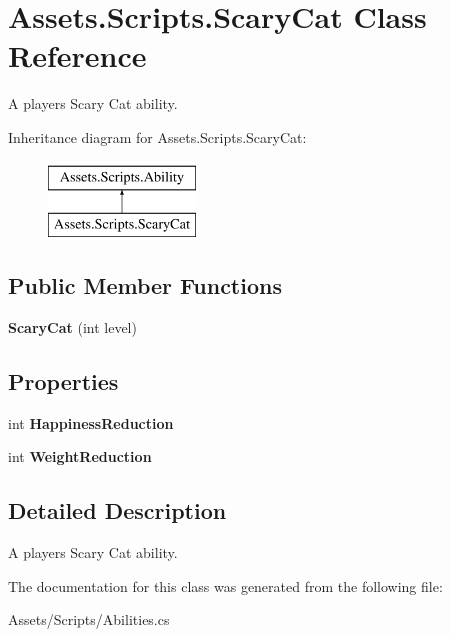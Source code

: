 \hypertarget{class_assets_1_1_scripts_1_1_scary_cat}{}\section{Assets.\+Scripts.\+Scary\+Cat Class Reference}
\label{class_assets_1_1_scripts_1_1_scary_cat}


A player\textquotesingle{}s Scary Cat ability.  


Inheritance diagram for Assets.\+Scripts.\+Scary\+Cat\+:\begin{figure}[H]
\begin{center}
\leavevmode
\includegraphics[height=2.000000cm]{class_assets_1_1_scripts_1_1_scary_cat}
\end{center}
\end{figure}
\subsection*{Public Member Functions}
\begin{DoxyCompactItemize}
\item 
{\bfseries Scary\+Cat} (int level)\hypertarget{class_assets_1_1_scripts_1_1_scary_cat_a35f8ccaa348aa0b258120276f2b9125d}{}\label{class_assets_1_1_scripts_1_1_scary_cat_a35f8ccaa348aa0b258120276f2b9125d}

\end{DoxyCompactItemize}
\subsection*{Properties}
\begin{DoxyCompactItemize}
\item 
int {\bfseries Happiness\+Reduction}\hypertarget{class_assets_1_1_scripts_1_1_scary_cat_aecd70b13cf92b4e7f1d1a8637e906d2b}{}\label{class_assets_1_1_scripts_1_1_scary_cat_aecd70b13cf92b4e7f1d1a8637e906d2b}

\item 
int {\bfseries Weight\+Reduction}\hypertarget{class_assets_1_1_scripts_1_1_scary_cat_a40374b53559a3669b59ddc1fe5078389}{}\label{class_assets_1_1_scripts_1_1_scary_cat_a40374b53559a3669b59ddc1fe5078389}

\end{DoxyCompactItemize}


\subsection{Detailed Description}
A player\textquotesingle{}s Scary Cat ability. 



The documentation for this class was generated from the following file\+:\begin{DoxyCompactItemize}
\item 
Assets/\+Scripts/Abilities.\+cs\end{DoxyCompactItemize}
